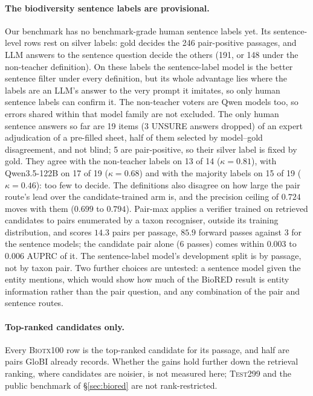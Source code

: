 \documentclass[11pt]{article}
\begin{document}
\paragraph{The biodiversity sentence labels are provisional.}
Our benchmark has no benchmark-grade human sentence labels yet. Its sentence-level rows rest on
silver labels: gold decides the 246 pair-positive passages, and LLM answers to the sentence question
decide the others (191, or 148 under the non-teacher definition). On these labels the sentence-label
model is the better sentence filter under every definition, but its whole advantage lies where the
labels are an LLM's answer to the very prompt it imitates, so only human sentence labels can confirm
it. The non-teacher voters are Qwen models too, so errors shared within that model family are not excluded. The only human sentence answers so far are 19 items (3 UNSURE answers dropped) of an expert
adjudication of a pre-filled sheet, half of them selected by model--gold disagreement, and not blind;
5 are pair-positive, so their silver label is fixed by gold. They agree with the non-teacher labels
on 13 of 14 ($\kappa = 0.81$), with Qwen3.5-122B on 17 of 19 ($\kappa = 0.68$) and with the majority
labels on 15 of 19 ($\kappa = 0.46$): too few to decide. The definitions also disagree
on how large the pair route's lead over the candidate-trained arm is, and the precision ceiling of
$0.724$ moves with them ($0.699$ to $0.794$). Pair-max applies a verifier trained on retrieved
candidates to pairs enumerated by a taxon recogniser, outside its training distribution, and scores
$14.3$ pairs per passage, $85.9$ forward passes against 3 for the sentence models; the candidate pair
alone (6 passes) comes within $0.003$ to $0.006$ AUPRC of it. The sentence-label
model's development split is by passage, not by taxon pair. Two further choices are untested: a
sentence model given the entity mentions, which would show how much of the BioRED result is entity
information rather than the pair question, and any combination of the pair and sentence routes.

\paragraph{Top-ranked candidates only.}
Every \textsc{Biotx100} row is the top-ranked candidate for its passage, and half are pairs GloBI
already records. Whether the gains hold further down the retrieval ranking, where candidates are
noisier, is not measured here; \textsc{Test299} and the public benchmark of \S\ref{sec:biored} are
not rank-restricted.
\end{document}
